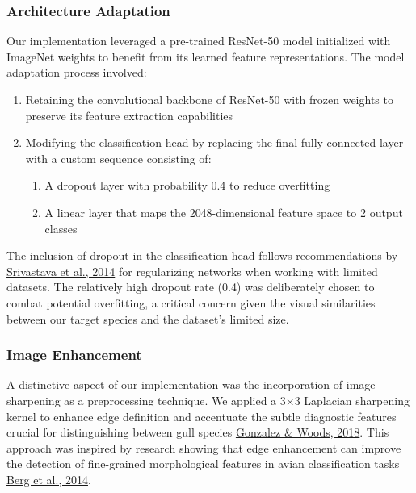 \documentclass[a4paper,12pt]{article}
\begin{document}
\subsubsection{Architecture Adaptation}

Our implementation leveraged a pre-trained ResNet-50 model initialized with ImageNet weights to benefit from its learned feature representations. The model adaptation process involved:

\begin{enumerate}
    \item Retaining the convolutional backbone of ResNet-50 with frozen weights to preserve its feature extraction capabilities
    \item Modifying the classification head by replacing the final fully connected layer with a custom sequence consisting of:
    \begin{enumerate}
        \item A dropout layer with probability 0.4 to reduce overfitting
        \item A linear layer that maps the 2048-dimensional feature space to 2 output classes
    \end{enumerate}
\end{enumerate}

The inclusion of dropout in the classification head follows recommendations by {\href{https://jmlr.org/papers/v15/srivastava14a.html}{Srivastava et al., 2014}} for regularizing networks when working with limited datasets. The relatively high dropout rate (0.4) was deliberately chosen to combat potential overfitting, a critical concern given the visual similarities between our target species and the dataset's limited size.

\subsubsection{Image Enhancement}

A distinctive aspect of our implementation was the incorporation of image sharpening as a preprocessing technique. We applied a 3×3 Laplacian sharpening kernel to enhance edge definition and accentuate the subtle diagnostic features crucial for distinguishing between gull species {\href{https://www.pearson.com/en-us/subject-catalog/p/digital-image-processing/P200000003546}{Gonzalez \& Woods, 2018}}. This approach was inspired by research showing that edge enhancement can improve the detection of fine-grained morphological features in avian classification tasks {\href{https://openaccess.thecvf.com/content_cvpr_2014/papers/Berg_Birdsnap_Large-scale_Fine-grained_2014_CVPR_paper.pdf}{Berg et al., 2014}}.
\end{document}

